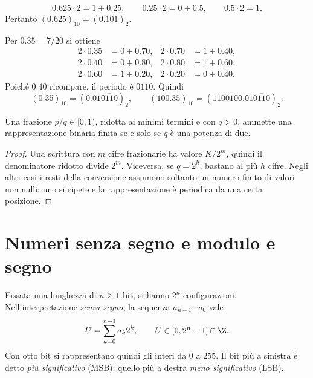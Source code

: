 \begin{example}
\[
  0.625\cdot2=1+0.25,\qquad
  0.25\cdot2=0+0.5,\qquad
  0.5\cdot2=1.
\]
Pertanto \((0.625)_{10}=(0.101)_2\).
\end{example}

\begin{example}
\label{ex:fi-frazione-periodica}
Per \(0.35=7/20\) si ottiene
\begin{align*}
  2\cdot0.35&=0+0.70, & 2\cdot0.70&=1+0.40,\\
  2\cdot0.40&=0+0.80, & 2\cdot0.80&=1+0.60,\\
  2\cdot0.60&=1+0.20, & 2\cdot0.20&=0+0.40.
\end{align*}
Poiché \(0.40\) ricompare, il periodo è \(0110\). Quindi
\[
  (0.35)_{10}=(0.01\overline{0110})_2,
  \qquad
  (100.35)_{10}=(1100100.01\overline{0110})_2.
\]
\end{example}

\begin{proposition}
\label{prop:fi-frazione-binaria-finita}
Una frazione \(p/q\in[0,1)\), ridotta ai minimi termini e con \(q>0\),
ammette una rappresentazione binaria finita se e solo se \(q\) è una
potenza di due.
\end{proposition}

\begin{proof}
Una scrittura con \(m\) cifre frazionarie ha valore \(K/2^m\), quindi
il denominatore ridotto divide \(2^m\). Viceversa, se \(q=2^h\), bastano
al più \(h\) cifre. Negli altri casi i resti della conversione assumono
soltanto un numero finito di valori non nulli: uno si ripete e la
rappresentazione è periodica da una certa posizione.
\end{proof}

\section{Numeri senza segno e modulo e segno}
\label{sec:fi-interi-rappresentazione}

Fissata una lunghezza di \(n\ge1\) bit, si hanno \(2^n\) configurazioni.
Nell'interpretazione \emph{senza segno}, la sequenza \(a_{n-1}\cdots a_0\) vale
\[
  U=\sum_{k=0}^{n-1}a_k2^k,
  \qquad U\in[0,2^n-1]\cap\Z.
\]
Con otto bit si rappresentano quindi gli interi da \(0\) a \(255\).
Il bit più a sinistra è detto \emph{più significativo} (MSB); quello
più a destra \emph{meno significativo} (LSB).

